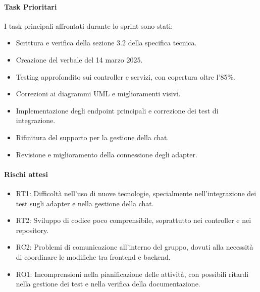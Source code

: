 \documentclass{article}
\begin{document}
            \paragraph{Task Prioritari}
            I task principali affrontati durante lo sprint sono stati:
            \begin{itemize}
                \item Scrittura e verifica della sezione 3.2 della specifica tecnica.
                \item Creazione del verbale del 14 marzo 2025.
                \item Testing approfondito sui controller e servizi, con copertura oltre l'85\%.
                \item Correzioni ai diagrammi UML e miglioramenti visivi.
                \item Implementazione degli endpoint principali e correzione dei test di integrazione.
                \item Rifinitura del supporto per la gestione della chat.
                \item Revisione e miglioramento della connessione degli adapter.
            \end{itemize}
            
            \paragraph{Rischi attesi}
            \begin{itemize}
                \item RT1: Difficoltà nell’uso di nuove tecnologie, specialmente nell’integrazione dei test sugli adapter e nella gestione della chat.
                \item RT2: Sviluppo di codice poco comprensibile, soprattutto nei controller e nei repository.
                \item RC2: Problemi di comunicazione all’interno del gruppo, dovuti alla necessità di coordinare le modifiche tra frontend e backend.
                \item RO1: Incomprensioni nella pianificazione delle attività, con possibili ritardi nella gestione dei test e nella verifica della documentazione.
            \end{itemize}
\end{document}
